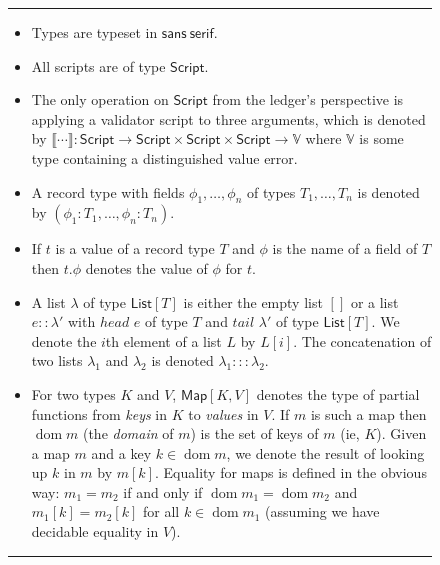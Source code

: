 \documentclass[a4paper]{article}
\newcommand{\s}{\textsf}  %
\theoremstyle{definition}  %
\newcommand\rfskip{7pt}
\newenvironment{ruledfigure}[1]{\begin{figure}[#1]\hrule\vspace{\rfskip}}{\vspace{\rfskip}\hrule\end{figure}}
\newcommand{\List}[1]{\ensuremath{\s{List}[#1]}}
\newcommand{\Map}[2]{\ensuremath{\s{Map}[#1,#2]}}
\newcommand{\dom}{\ensuremath{\mathop{\mathrm{dom}}}}
\begin{document}
\begin{ruledfigure}{H}
\begin{itemize}
\item Types are typeset in $\mathsf{sans~serif}$.

\item All scripts are of type $\mathsf{Script}$.

\item The only operation on $\mathsf{Script}$ from the ledger's
  perspective is applying a validator script to three arguments,
  which is denoted by $\llbracket \cdots \rrbracket :
  \mathsf{Script} \rightarrow \mathsf{Script} \times \mathsf{Script}
    \times \mathsf{Script} \rightarrow \mathbb{V}$ where $\mathbb{V}$
    is some type containing a distinguished value
    \textsf{error}\footnotemark.

\item A record type with fields $\phi_1, \ldots, \phi_n$ of types $T_1,
  \ldots, T_n$ is denoted by $(\phi_1 : T_1, \ldots, \phi_n : T_n)$.

\item If $t$ is a value of a record type $T$ and $\phi$ is the name
  of a field of $T$ then $t.\phi$ denotes the value of $\phi$ for
  $t$.
  
\item A list $\lambda$ of type $\List{T}$ is
    either the empty list $[]$ or a list $e :: \lambda'$ with $head$
    $e$ of type $T$ and $tail$ $\lambda'$ of type
    $\List{T}$. We denote the $i$th element of a list
    $L$ by $L[i]$.
    The concatenation of two lists $\lambda_1$ and
    $\lambda_2$ is denoted $\lambda_1 ::: \lambda_2$.

  \item For two types $K$ and $V$, $\Map{K}{V}$ denotes the type of
    partial functions from \textit{keys} in $K$ to \textit{values} in
    $V$.  If $m$ is such a map then $\dom m$ (the \textit{domain} of
    $m$) is the set of keys of $m$ (ie, $K$).  Given a map $m$ and a
    key $k \in \dom m$, we denote the result of looking up $k$ in $m$
    by $m[k]$.  Equality for maps is defined in the obvious way: $m_1
    = m_2$ if and only if $\dom m_1 = \dom m_2$ and $m_1[k] = m_2[k]$
    for all $k \in \dom m_1$ (assuming we have decidable equality in $V$).
    

\end{itemize}
\end{ruledfigure}
\end{document}
